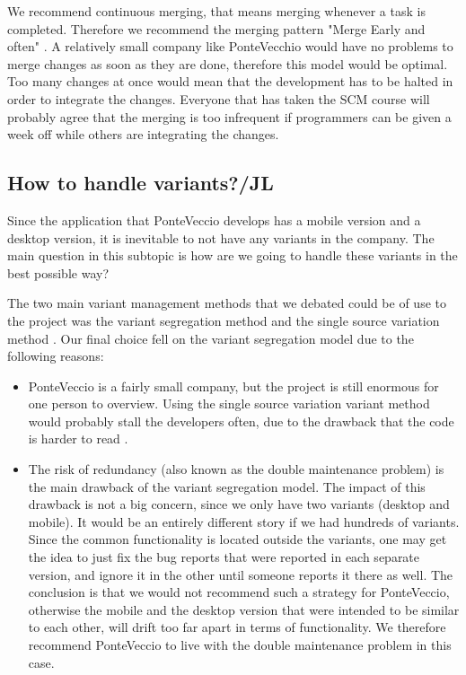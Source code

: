 \documentclass[10pt]{article}
\begin{document}
\noindent We recommend continuous merging, that means merging whenever a task is completed. Therefore we recommend the merging pattern "Merge Early and often" \cite{Appleton}. A relatively small company like PonteVecchio would have no problems to merge changes as soon as they are done, therefore this model would be optimal. Too many changes at once would mean that the development has to be halted in order to integrate the changes. Everyone that has taken the SCM course will probably agree that the merging is too infrequent if programmers can be given a week off while others are integrating the changes.

\subsection{How to handle variants?/JL}
Since the application that PonteVeccio develops has a mobile version and a desktop version, it is inevitable to not have any variants in the company. The main question in this subtopic is how are we going to handle these variants in the best possible way?

\noindent The two main variant management methods that we debated could be of use to the project was the variant segregation method and the single source variation method \cite{Mahler}. Our final choice fell on the variant segregation model due to the following reasons:
\begin{itemize}
\item PonteVeccio is a fairly small company, but the project is still enormous for one person to overview. Using the single source variation variant method would probably stall the developers often, due to the drawback that the code is harder to read \cite{Mahler}.
\item The risk of redundancy (also known as the double maintenance problem\cite{Babich}) is the main drawback of the variant segregation model\cite{Mahler}. The impact of this drawback is not a big concern, since we only have two variants (desktop and mobile). It would be an entirely different story if we had hundreds of variants. Since the common functionality is located outside the variants, one may get the idea to just fix the bug reports that were reported in each separate version, and ignore it in the other until someone reports it there as well. The conclusion is that we would not recommend such a strategy for PonteVeccio, otherwise the mobile and the desktop version that were intended to be similar to each other, will drift too far apart in terms of functionality. We therefore recommend PonteVeccio to live with the double maintenance problem in this case.

\end{itemize}
\noindent
\end{document}
